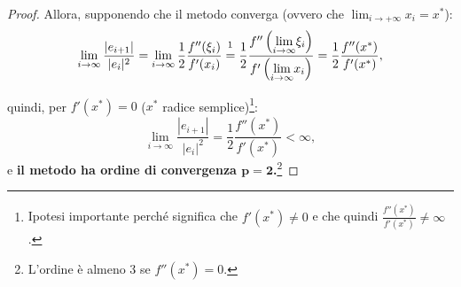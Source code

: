\begin{proof}
	\noindent Allora, supponendo che il metodo converga (ovvero che $\lim_{i\rightarrow+\infty}x_i=x^*$): 
	\begin{equation*}
		\lim_{i\to\infty}{\frac{|e_{i+1}|}{|e_i|^2}}=\lim_{i\to\infty}{\frac{1}{2}\frac{f''(\xi_i)}{f'(x_i)}}\overset{\footnotemark}{=}\frac{1}{2}\frac{f''\left(\underset{i\to\infty}{\lim}\xi_i\right)}{f'\left(\underset{i\to\infty}{\lim}{x_i}\right)}=\frac{1}{2}\frac{f''(x^*)}{f'(x^*)},
	\end{equation*}
	
	
	\noindent quindi, per $f'(x^*)=0$ ($x^*$ radice semplice)\footnote{Ipotesi importante perché significa che $f'(x^*)\neq 0$ e che quindi $\frac{f''(x^*)}{f'(x^*)}\neq\infty$.}:
	\begin{equation*}
		\lim_{i\to\infty}{\frac{|e_{i+1}|}{|e_i|^2}}=\frac{1}{2}\frac{f''(x^*)}{f'(x^*)}<\infty,
	\end{equation*}
	e \textbf{il metodo ha ordine di convergenza $\boldsymbol{p=2}$.}\footnote{L'ordine è almeno 3 se $f''(x^*)=0$.}
\end{proof}

